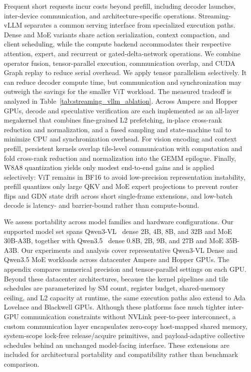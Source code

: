 Frequent short requests incur costs beyond prefill, including decoder launches, inter-device communication, and architecture-specific operations. Streaming-vLLM separates a common serving interface from specialized execution paths. Dense and MoE variants share action serialization, context compaction, and client scheduling, while the compute backend accommodates their respective attention, expert, and recurrent or gated-delta-network operations. We combine operator fusion, tensor-parallel execution, communication overlap, and CUDA Graph replay to reduce serial overhead. We apply tensor parallelism selectively. It can reduce decoder compute time, but communication and synchronization may outweigh the savings for the smaller ViT workload. The measured tradeoff is analyzed in Table~\ref{tab:streaming_vllm_ablation}. Across Ampere and Hopper GPUs, decode and speculative verification are each implemented as an all-layer megakernel that combines fine-grained L2 prefetching, in-place cross-rank reduction and normalization, and a fused sampling and state-machine tail to minimize CPU and synchronization overhead. For vision encoding and context prefill, persistent kernels overlap tile-level communication with computation and fold cross-rank reduction and normalization into the GEMM epilogue. Finally, W8A8 quantization yields only modest end-to-end gains and is applied selectively: ViT remains in BF16 to avoid low-precision representation instability, prefill quantizes only large QKV and MoE expert projections to prevent router flips and GDN state drift across short single-frame extensions, and low-batch decode is latency- and barrier-bound rather than compute-bound.

We assess portability across model families and hardware configurations. Our supported model set spans Qwen3-VL~\cite{qwen3} dense 2B, 4B, 8B, and 32B and MoE 30B-A3B, together with Qwen3.5~\cite{qwen35} dense 0.8B, 2B, 9B, and 27B and MoE 35B-A3B. Our experiments and analysis cover representative Qwen3-VL Dense and Qwen3.5 MoE workloads across datacenter Ampere and Hopper GPUs. The appendix compares numerical precision and tensor-parallel settings on each GPU. Beyond these datacenter architectures, because the kernel pipelines and tile schedules are parameterized by SM count, register budget, shared-memory ceiling, and L2 capacity at runtime, the same execution paths also extend to Ada Lovelace and Blackwell GPUs. Although these platforms face much tighter inter-GPU communication constraints without NVLink peer-to-peer interconnect, a custom communication layer encapsulates zero-copy host-mapped shared memory, system-scope lock-free release/acquire primitives, and payload-adaptive collective schedules behind an unchanged model-facing interface. These extensions are included for architectural portability and compatibility rather than benchmark comparison.

